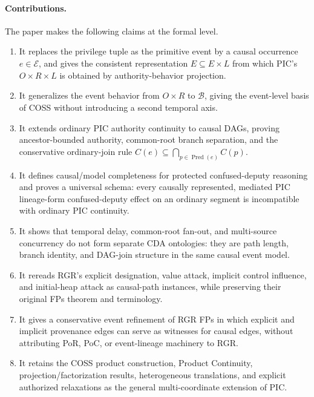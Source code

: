 \documentclass[10pt,twocolumn]{article}
\newcommand{\Pred}{\operatorname{Pred}}
\begin{document}
\paragraph{Contributions.}
The paper makes the following claims at the formal level.
\begin{enumerate}[leftmargin=*]
  \item It replaces the privilege tuple as the primitive event by a causal
        occurrence $e\in\mathcal E$, and gives the consistent representation
        $\widehat E\subseteq E\times L$ from which PIC's
        $O\times R\times L$ is obtained by authority-behavior projection.
  \item It generalizes the event behavior from $O\times R$ to
        $\mathcal B$, giving the event-level basis of COSS without introducing
        a second temporal axis.
  \item It extends ordinary PIC authority continuity to causal DAGs, proving
        ancestor-bounded authority, common-root branch separation, and the
        conservative ordinary-join rule
        $C(e)\subseteq\bigcap_{p\in\Pred(e)}C(p)$.
  \item It defines causal/model completeness for protected confused-deputy
        reasoning and proves a universal schema: every causally represented,
        mediated PIC lineage-form confused-deputy effect on an ordinary segment
        is incompatible with ordinary PIC continuity.
  \item It shows that temporal delay, common-root fan-out, and multi-source
        concurrency do not form separate CDA ontologies: they are path length,
        branch identity, and DAG-join structure in the same causal event model.
  \item It rereads RGR's explicit designation, value attack, implicit control
        influence, and initial-heap attack as causal-path instances, while
        preserving their original FPs theorem and terminology.
  \item It gives a conservative event refinement of RGR FPs in which explicit
        and implicit provenance edges can serve as witnesses for causal edges,
        without attributing PoR, PoC, or event-lineage machinery to RGR.
  \item It retains the COSS product construction, Product Continuity,
        projection/factorization results, heterogeneous translations, and
        explicit authorized relaxations as the general multi-coordinate
        extension of PIC.
\end{enumerate}
\end{document}

